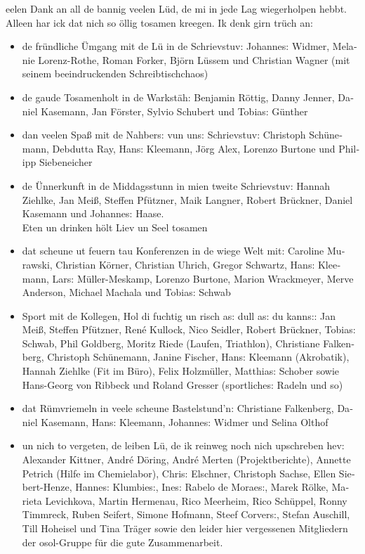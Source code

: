 \begin{otherlanguage}{ngerman}
eelen Dank an all de bannig veelen Lüd, de mi in jede Lag wiegerholpen hebbt. Alleen har ick dat
nich so öllig tosamen kreegen. Ik denk girn trüch an:
\vspace*{2em}
%
\begin{itemize}
\item de fründliche Ümgang mit de Lü in de Schrievstuv:
Johannes: Widmer, Melanie Lorenz-Rothe, Roman Forker, Björn Lüssem und Christian Wagner (mit seinem beeindruckenden Schreibtischchaos)
%
\item de gaude Tosamenholt in de Warkstäh:
Benjamin Röttig, Danny Jenner, Daniel Kasemann, Jan Förster, Sylvio Schubert und Tobias: Günther
%
\item dan veelen Spaß mit de Nahbers: vun uns: Schrievstuv:
Christoph Schünemann, Debdutta Ray, Hans: Kleemann, Jörg Alex, Lorenzo Burtone und Philipp Siebeneicher
%
\item de Ünnerkunft in de Middagsstunn in mien tweite Schrievstuv:
Hannah Ziehlke, Jan Meiß, Steffen Pfützner, Maik Langner, Robert Brückner, Daniel Kasemann und Johannes: Haase.\\
Eten un drinken hölt Liev un Seel tosamen
%
\item dat scheune ut feuern tau Konferenzen in de wiege Welt mit:
Caroline Murawski, Christian Körner, Christian Uhrich, Gregor Schwartz, Hans: Kleemann, Lars: Müller-Meskamp, Lorenzo Burtone, Marion Wrackmeyer, Merve Anderson, Michael Machala und Tobias: Schwab
%
\item Sport mit de Kollegen, Hol di fuchtig un risch as: dull as: du kanns:{}:
Jan Meiß, Steffen Pfützner, René Kullock, Nico Seidler, Robert Brückner, Tobias: Schwab, Phil Goldberg, Moritz Riede (Laufen, Triathlon), Christiane Falkenberg, Christoph Schünemann, Janine Fischer, Hans: Kleemann (Akrobatik), Hannah Ziehlke (Fit im Büro), Felix Holzmüller, Matthias: Schober sowie Hans-Georg von Ribbeck und Roland Gresser (sportliches: Radeln und so)
%
\item dat Rümvriemeln in veele scheune Bastelstund'n:
Christiane Falkenberg, Daniel Kasemann, Hans: Kleemann, Johannes: Widmer und Selina Olthof
%
\item un nich to vergeten, de leiben Lü, de ik reinweg noch nich upschreben hev:
Alexander Kittner, André Döring, André Merten (Projektberichte), Annette Petrich (Hilfe im Chemielabor), Chris: Elschner, Christoph Sachse, Ellen Siebert-Henze, Hannes: Klumbies:, Ines: Rabelo de Moraes:, Marek Rölke, Marieta Levichkova, Martin Hermenau, Rico Meerheim, Rico Schüppel, Ronny Timmreck, Ruben Seifert, Simone Hofmann, Steef Corvers:, Stefan Auschill, Till Hoheisel und Tina Träger sowie den leider hier vergessenen Mitgliedern der osol-Gruppe für die gute Zusammenarbeit.
%
\end{itemize}


\end{otherlanguage}
